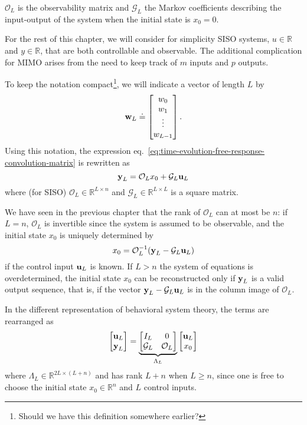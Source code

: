 $\mathcal{O}_L$ is the observability matrix and $\mathcal{G}_L$ the Markov coefficients describing the input-output of the system when the initial state is $x_0=0$.

For the rest of this chapter, we will consider for simplicity SISO systems, $u\in \mathbb{R}$ and $y\in \mathbb{R}$, that are both controllable and observable. The additional complication for MIMO arises from the need to keep track of $m$ inputs and $p$ outputs.

To keep the notation compact\footnote{Should we have this definition somewhere earlier?}, we will indicate a vector of length $L$ by
\begin{equation*}
  \boldsymbol{\mathrm{w}}_L \doteq
  \begin{bmatrix}
    w_0 \\ w_1 \\ \vdots \\ w_{L-1}
  \end{bmatrix}.
\end{equation*}
Using this notation, the expression eq.~\eqref{eq:time-evolution-free-response-convolution-matrix} is rewritten as
\begin{equation*}
  \boldsymbol{\mathrm{y}}_L = \mathcal{O}_Lx_0 + \mathcal{G}_L\boldsymbol{\mathrm{u}}_L
\end{equation*}
where (for SISO) $\mathcal{O}_L\in\mathbb{R}^{L\times n}$ and $\mathcal{G}_L\in \mathbb{R}^{L\times L}$ is a square matrix.

We have seen in the previous chapter that the rank of $\mathcal{O}_L$ can at most be $n$: if $L=n$, $\mathcal{O}_L$ is invertible since the system is assumed to be observable, and the initial state $x_0$ is uniquely determined by
\begin{equation*}
  x_0 = \mathcal{O}_L^{-1}(\boldsymbol{\mathrm{y}}_L - \mathcal{G}_L\boldsymbol{\mathrm{u}}_L)
\end{equation*}
if the control input $\boldsymbol{\mathrm{u}}_L$ is known. If $L>n$ the system of equations is overdetermined, the initial state $x_0$ can be reconstructed only if $\boldsymbol{\mathrm{y}}_L$ is a valid output sequence, that is, if the vector $\boldsymbol{\mathrm{y}}_L - \mathcal{G}_L\boldsymbol{\mathrm{u}}_L$ is in the column image of $\mathcal{O}_L$.

In the different representation of behavioral system theory, the terms are rearranged as
\begin{equation*}
  \begin{bmatrix}
    \boldsymbol{\mathrm{u}}_L \\ \boldsymbol{\mathrm{y}}_L
  \end{bmatrix} = \underbrace{
  \begin{bmatrix}
    I_L & 0 \\ \mathcal{G}_L & \mathcal{O}_L
  \end{bmatrix}}_{\Lambda_L}
\begin{bmatrix}
  \boldsymbol{\mathrm{u}}_L \\ x_0
\end{bmatrix}
\end{equation*}
where $\Lambda_L\in \mathbb{R}^{2L\times(L+n)}$ and has rank $L+n$ when $L\ge n$, since one is free to choose the initial state $x_0\in \mathbb{R}^n$ and $L$ control inputs.

